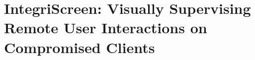 


\chapter[IntegriScreen]{IntegriScreen: Visually Supervising Remote User Interactions on Compromised Clients}
\label{ch:integriscreen}





